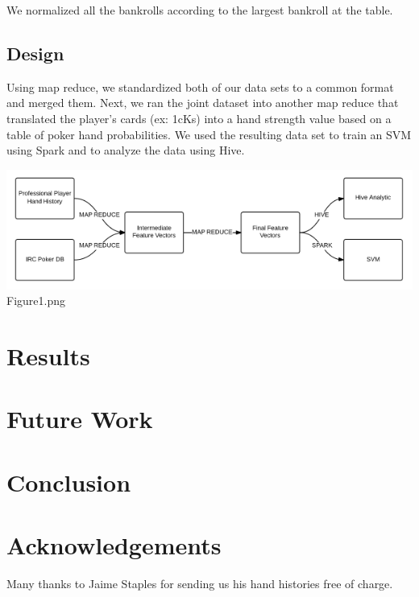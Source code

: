 \documentclass[twoside]{article}
\begin{document}
\begin{multicols}{2}
We normalized all the bankrolls according to the largest bankroll at the table. 

\subsection{Design}
Using map reduce, we standardized both of our data sets to a common format and merged them. Next, we ran the joint dataset into another map reduce that translated the player's cards (ex: 1cKs) into a hand strength value based on a table of poker hand probabilities. We used the resulting data set to train an SVM using Spark and to analyze the data using Hive. 

\includegraphics[width=1\columnwidth]{Flowchart.png}
Figure1.png



\section{Results}


\section{Future Work}


\section{Conclusion}


\section{Acknowledgements}

Many thanks to Jaime Staples for sending us his hand histories free of charge. 



\end{multicols}
\end{document}
